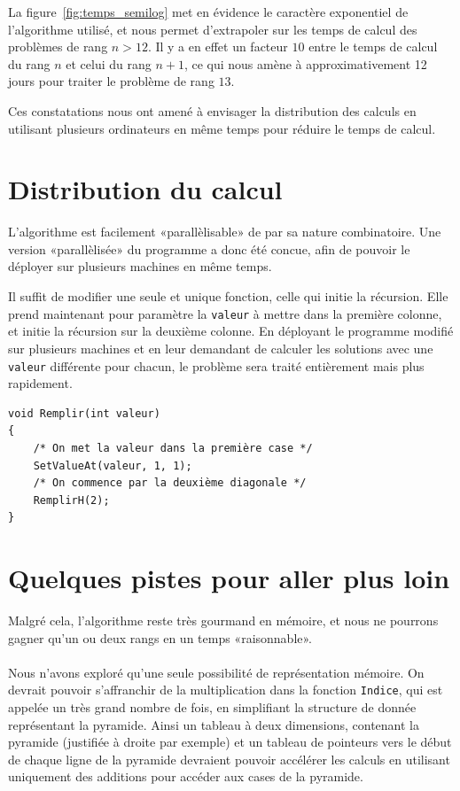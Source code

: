 \documentclass[10pt]{article}%
\begin{document}
La figure~\ref{fig:temps_semilog} met en évidence le caractère exponentiel de l'algorithme
utilisé, et nous permet d'extrapoler sur les temps de calcul des problèmes de rang $n > 12$.
Il y a en effet un facteur $10$ entre le temps de calcul du rang $n$ et celui du rang $n+1$,
ce qui nous amène à approximativement 12 jours pour traiter le problème de rang $13$.

Ces constatations nous ont amené à envisager la distribution des calculs en utilisant plusieurs
ordinateurs en même temps pour réduire le temps de calcul.


\section{Distribution du calcul}
L'algorithme est facilement «parallèlisable» de par sa nature combinatoire.
Une version «parallèlisée» du programme a donc été concue, afin de pouvoir le déployer
sur plusieurs machines en même temps.

Il suffit de modifier une seule et unique fonction, celle qui initie la récursion.
Elle prend maintenant pour paramètre la \texttt{valeur} à mettre dans la première colonne,
et initie la récursion sur la deuxième colonne. En déployant le programme modifié sur
plusieurs machines et en leur demandant de calculer les solutions avec une \texttt{valeur}
différente pour chacun, le problème sera traité entièrement mais plus rapidement.
\begin{verbatim}
void Remplir(int valeur)
{
    /* On met la valeur dans la première case */
    SetValueAt(valeur, 1, 1);
    /* On commence par la deuxième diagonale */
    RemplirH(2);
}
\end{verbatim}


\section{Quelques pistes pour aller plus loin}
Malgré cela, l'algorithme reste très gourmand en mémoire, et nous ne pourrons gagner qu'un ou deux
rangs en un temps «raisonnable».
\paragraph*{}
Nous n'avons exploré qu'une seule possibilité de représentation mémoire. On devrait pouvoir s'affranchir
de la multiplication dans la fonction \texttt{Indice}, qui est appelée un très grand nombre de fois,
en simplifiant la structure de donnée représentant la pyramide. Ainsi un tableau à deux dimensions,
contenant la pyramide (justifiée à droite par exemple) et un tableau de pointeurs vers le début
de chaque ligne de la pyramide devraient pouvoir accélérer les calculs en utilisant uniquement
des additions pour accéder aux cases de la pyramide.
\end{document}
